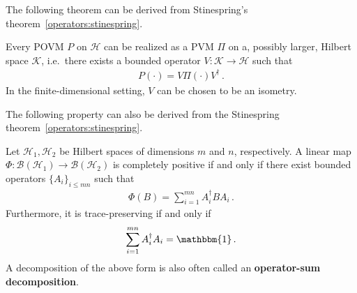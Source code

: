     The following theorem can be derived from Stinespring's theorem~\ref{operators:stinespring}.
    \begin{theorem}
        Every POVM $P$ on $\mathcal{H}$ can be realized as a PVM $\Pi$ on a, possibly larger, Hilbert space $\mathcal{K}$, i.e.~there exists a bounded operator $V:\mathcal{K}\rightarrow\mathcal{H}$ such that
        \begin{gather}
            P(\cdot) = V\Pi(\cdot)V^\dagger\,.
        \end{gather}
        In the finite-dimensional setting, $V$ can be chosen to be an isometry.
    \end{theorem}


    The following property can also be derived from the Stinespring theorem~\ref{operators:stinespring}.
    \begin{property}\label{qc:kraus}
        Let $\mathcal{H}_1,\mathcal{H}_2$ be Hilbert spaces of dimensions $m$ and $n$, respectively. A linear map $\Phi:\mathcal{B}(\mathcal{H}_1)\rightarrow\mathcal{B}(\mathcal{H}_2)$ is completely positive if and only if there exist bounded operators $\{A_i\}_{i\leq mn}$ such that
        \begin{gather}
            \Phi(B) = \sum_{i=1}^{mn}A^\dag_iBA_i\,.
        \end{gather}
        Furthermore, it is trace-preserving if and only if
        \begin{gather}
            \sum_{i=1}^{mn}A^\dag_iA_i = \mathbbm{1}\,.
        \end{gather}
        A decomposition of the above form is also often called an \textbf{operator-sum decomposition}.
    \end{property}


